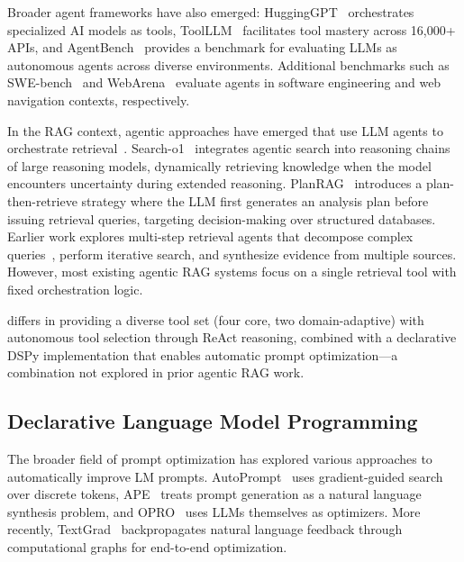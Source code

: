 Broader agent frameworks have also emerged: HuggingGPT~\cite{shen2023hugginggpt} orchestrates specialized AI models as tools, ToolLLM~\cite{qin2024toolllm} facilitates tool mastery across 16,000+ APIs, and AgentBench~\cite{liu2024agentbench} provides a benchmark for evaluating LLMs as autonomous agents across diverse environments.
Additional benchmarks such as SWE-bench~\cite{jimenez2024swebench} and WebArena~\cite{zhou2024webarena} evaluate agents in software engineering and web navigation contexts, respectively.

In the RAG context, agentic approaches have emerged that use LLM agents to orchestrate retrieval~\cite{singh2025agenticrag}.
Search-o1~\cite{li2025searcho1} integrates agentic search into reasoning chains of large reasoning models, dynamically retrieving knowledge when the model encounters uncertainty during extended reasoning.
PlanRAG~\cite{lee2024planrag} introduces a plan-then-retrieve strategy where the LLM first generates an analysis plan before issuing retrieval queries, targeting decision-making over structured databases.
Earlier work explores multi-step retrieval agents that decompose complex queries~\cite{khot2023decomposed}, perform iterative search, and synthesize evidence from multiple sources.
However, most existing agentic RAG systems focus on a single retrieval tool with fixed orchestration logic.

\ours{} differs in providing a diverse tool set (four core, two domain-adaptive) with autonomous tool selection through ReAct reasoning, combined with a declarative DSPy implementation that enables automatic prompt optimization---a combination not explored in prior agentic RAG work.

\subsection{Declarative Language Model Programming}
\label{subsec:rw_dspy}

The broader field of prompt optimization has explored various approaches to automatically improve LM prompts.
AutoPrompt~\cite{shin2020autoprompt} uses gradient-guided search over discrete tokens, APE~\cite{zhou2023ape} treats prompt generation as a natural language synthesis problem, and OPRO~\cite{yang2024opro} uses LLMs themselves as optimizers.
More recently, TextGrad~\cite{yuksekgonul2025textgrad} backpropagates natural language feedback through computational graphs for end-to-end optimization.

